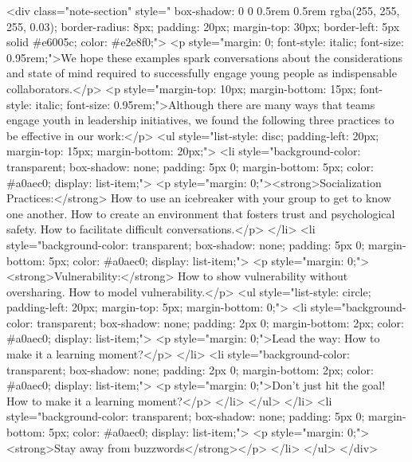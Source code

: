         <div class="note-section" style="  box-shadow: 0 0 0.5rem 0.5rem rgba(255, 255, 255, 0.03); border-radius: 8px; padding: 20px; margin-top: 30px; border-left: 5px solid #e6005c; color: #e2e8f0;">
            <p style="margin: 0; font-style: italic; font-size: 0.95rem;">We hope these examples spark conversations about the considerations and state of mind required to successfully engage young people as indispensable collaborators.</p>
            <p style="margin-top: 10px; margin-bottom: 15px; font-style: italic; font-size: 0.95rem;">Although there are many ways that teams engage youth in leadership initiatives, we found the following three practices to be effective in our work:</p>
            <ul style="list-style: disc; padding-left: 20px; margin-top: 15px; margin-bottom: 20px;">
                <li style="background-color: transparent; box-shadow: none; padding: 5px 0; margin-bottom: 5px; color: #a0aec0; display: list-item;">
                    <p style="margin: 0;"><strong>Socialization Practices:</strong> How to use an icebreaker with your group to get to know one another. How to create an environment that fosters trust and psychological safety. How to facilitate difficult conversations.</p>
                </li>
                <li style="background-color: transparent; box-shadow: none; padding: 5px 0; margin-bottom: 5px; color: #a0aec0; display: list-item;">
                    <p style="margin: 0;"><strong>Vulnerability:</strong> How to show vulnerability without oversharing. How to model vulnerability.</p>
                    <ul style="list-style: circle; padding-left: 20px; margin-top: 5px; margin-bottom: 0;">
                        <li style="background-color: transparent; box-shadow: none; padding: 2px 0; margin-bottom: 2px; color: #a0aec0; display: list-item;">
                            <p style="margin: 0;">Lead the way: How to make it a learning moment?</p>
                        </li>
                        <li style="background-color: transparent; box-shadow: none; padding: 2px 0; margin-bottom: 2px; color: #a0aec0; display: list-item;">
                            <p style="margin: 0;">Don't just hit the goal! How to make it a learning moment?</p>
                        </li>
                    </ul>
                </li>
                <li style="background-color: transparent; box-shadow: none; padding: 5px 0; margin-bottom: 5px; color: #a0aec0; display: list-item;">
                    <p style="margin: 0;"><strong>Stay away from buzzwords</strong></p>
                </li>
            </ul>
        </div>

